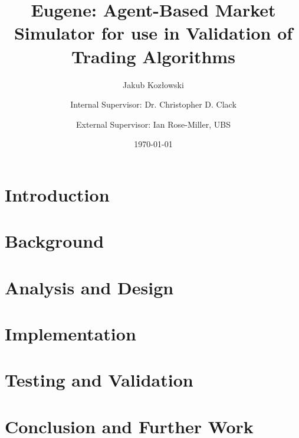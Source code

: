 \documentclass[a4, 11pt]{report}
\title{\textbf{Eugene: Agent-Based Market Simulator for use in Validation of Trading Algorithms}}
\author{Jakub Koz\l owski \and Internal Supervisor: Dr. Christopher D. Clack \and External Supervisor: Ian Rose-Miller, UBS}
\date{\today}
\begin{document}
\maketitle

\tableofcontents

\pagestyle{fancy}

\chapter{Introduction}
\label{introduction}





\chapter{Background}
\label{background}

\chapter{Analysis and Design}
\label{analysis-and-design}




\chapter{Implementation}
\label{implementation}

\chapter{Testing and Validation}
\label{testing}

\chapter{Conclusion and Further Work}
\label{conclusion}
\end{document}
